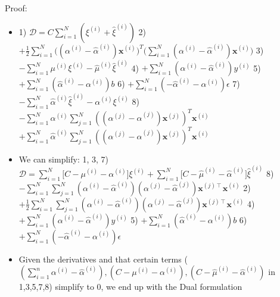 \begin{itemize}
    Proof:
    \begin{itemize}
        \item 1) $
        \mathcal{D} = C \sum_{i=1}^N (\xi^{(i)} + \hat{\xi}^{(i)})$
        2) $
        + \frac{1}{2} \sum_{i=1}^N \Big((\alpha^{(i)} - \hat{\alpha}^{(i)}) \boldsymbol{x}^{(i)}\Big)^T \Big(\sum_{i=1}^N (\alpha^{(i)} - \hat{\alpha}^{(i)}) \boldsymbol{x}^{(i)}\Big)
        $
        3) $
        - \sum_{i=1}^N \mu^{(i)} \xi^{(i)} - \hat{\mu}^{(i)} \hat{\xi}^{(i)}
        $ 
        4) $ 
        + \sum_{i=1}^N (\alpha^{(i)} - \hat{\alpha}^{(i)}) y^{(i)}
        $ 
        5) $
        + \sum_{i=1}^N (\hat{\alpha}^{(i)} - \alpha^{(i)}) b
        $
        6) $
        + \sum_{i=1}^N (-\hat{\alpha}^{(i)} - \alpha^{(i)}) \epsilon
        $
        7) $
        - \sum_{i=1}^N \hat{\alpha}^{(i)}\hat{\xi}^{(i)} - \alpha^{(i)}\xi^{(i)}
        $
        8) $
        - \sum_{i=1}^N \alpha^{(i)} \sum_{j=1}^N ((\alpha^{(j)} - \hat{\alpha}^{(j)}) \boldsymbol{x}^{(j)})^T \boldsymbol{x}^{(i)}
        $
        $
        + \sum_{i=1}^N \hat{\alpha}^{(i)} \sum_{j=1}^N ((\alpha^{(j)} - \hat{\alpha}^{(j)}) \boldsymbol{x}^{(j)})^T \boldsymbol{x}^{(i)}
        $
        \item We can simplify:
        1, 3, 7) $
        \mathcal{D} = \sum_{i=1}^N \Big[C - \mu^{(i)} - \alpha^{(i)}\Big] \xi^{(i)} + \sum_{i=1}^N \Big[C - \hat{\mu}^{(i)} - \hat{\alpha}^{(i)}\Big] \hat{\xi}^{(i)}
        $
        8) $
        - \sum_{i=1}^N \sum_{j=1}^N (\alpha^{(i)} - \hat{\alpha}^{(i)})(\alpha^{(j)} - \hat{\alpha}^{(j)}) \boldsymbol{x}^{(j)\intercal} \boldsymbol{x}^{(i)}
        $
        2) $
        + \frac{1}{2} \sum_{i=1}^N \sum_{j=1}^N (\alpha^{(i)} - \hat{\alpha}^{(i)})(\alpha^{(j)} - \hat{\alpha}^{(j)}) \boldsymbol{x}^{(j)\intercal} \boldsymbol{x}^{(i)}
        $
        4) $
        + \sum_{i=1}^N (\alpha^{(i)} - \hat{\alpha}^{(i)}) y^{(i)}
        $
        5) $
        + \sum_{i=1}^N (\hat{\alpha}^{(i)} - \alpha^{(i)} ) b
        $
        6) $
        + \sum_{i=1}^N (- \hat{\alpha}^{(i)} - \alpha^{(i)}) \epsilon 
        $
        \item Given the derivatives and that certain terms ($(\sum_{i=1}^n \alpha^{(i)} - \hat{\alpha}^{(i)}), (C-\mu^{(i)}-\alpha^{(i)}), (C-\hat{\mu}^{(i)}-\hat{\alpha}^{(i)})$ in 1,3,5,7,8) simplify to $0$, we end up with the Dual formulation
    \end{itemize}
\end{itemize}